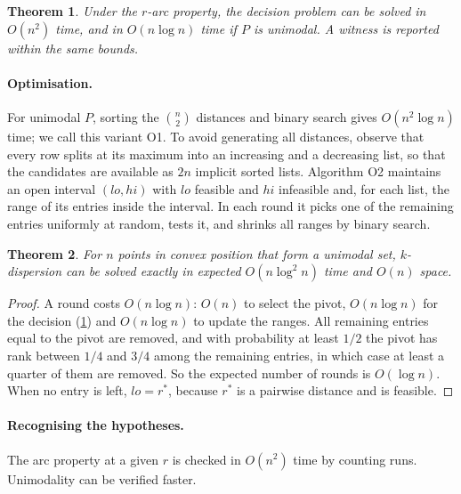 \documentclass[11pt,a4paper]{article}
\newtheorem{theorem}{Theorem}
\theoremstyle{definition}
\theoremstyle{remark}
\newcommand{\rstar}{r^{*}}
\begin{document}
\begin{theorem}\label{thm:arcdecision}
Under the $r$-arc property, the decision problem can be solved in
$O(n^2)$ time, and in $O(n\log n)$ time if $P$ is unimodal. A witness is
reported within the same bounds.
\end{theorem}

\paragraph{Optimisation.}
For unimodal $P$, sorting the $\binom n2$ distances and binary search gives
$O(n^2\log n)$ time; we call this variant \textsc{O1}. To avoid generating
all distances, observe that every row splits at its maximum into an increasing
and a decreasing list, so that the candidates are available as $2n$ implicit
sorted lists. Algorithm \textsc{O2} maintains an open interval $(lo,hi)$ with
$lo$ feasible and $hi$ infeasible and, for each list, the range of its entries
inside the interval. In each round it picks one of the remaining entries
uniformly at random, tests it, and shrinks all ranges by binary search.

\begin{theorem}\label{thm:arcopt}
For $n$ points in convex position that form a unimodal set, $k$-dispersion can
be solved exactly in expected $O(n\log^2n)$ time and $O(n)$ space.
\end{theorem}
\begin{proof}
A round costs $O(n\log n)$: $O(n)$ to select the pivot, $O(n\log n)$ for the
decision (\cref{thm:arcdecision}) and $O(n\log n)$ to update the ranges. All
remaining entries equal to the pivot are removed, and with probability at
least $1/2$ the pivot has rank between $1/4$ and $3/4$ among the remaining
entries, in which case at least a quarter of them are removed. So the expected
number of rounds is $O(\log n)$. When no entry is left, $lo=\rstar$, because
$\rstar$ is a pairwise distance and is feasible.
\end{proof}

\paragraph{Recognising the hypotheses.}
The arc property at a given $r$ is checked in $O(n^2)$ time by counting runs.
Unimodality can be verified faster.
\end{document}

